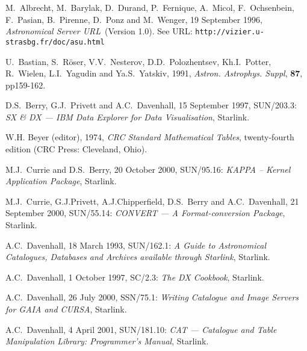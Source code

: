 \documentclass[twoside,11pt]{article}
\newcommand{\xref}[3]{#1}
\renewcommand{\_}{\texttt{\symbol{95}}}
\begin{document}


% 
\newpage
{}
\begin{thebibliography}{99}

   M.~Albrecht, M.~Barylak, D.~Durand, P.~Fernique, 
   A.~Micol, F.~Ochsenbein, F.~Pasian, B.~Pirenne, D.~Ponz and 
   M.~Wenger, 19 September 1996, {\it Astronomical Server URL}\,
   (Version 1.0).  See URL: {\tt http://vizier.u-strasbg.fr/doc/asu.html}

   U.~Bastian, S.~R\"{o}ser, V.V.~Nesterov, D.D.~Polozhentsev,
   Kh.I.~Potter, R.~Wielen, L.I.~Yagudin and Ya.S.~Yatskiv, 1991,
   {\it Astron. Astrophys. Suppl}, {\bf 87}, pp159-162.

   D.S.~Berry, G.J.~Privett and A.C.~Davenhall,
   15 September 1997, \xref{SUN/203.3}{sun203}{}: {\it SX \& DX ---
   IBM Data Explorer for Data Visualisation}, Starlink.

   W.H. Beyer (editor), 1974, {\it CRC Standard
   Mathematical Tables}, twenty-fourth edition (CRC Press: Cleveland,
   Ohio).

   M.J.~Currie and D.S.~Berry, 20 October 2000,
   \xref{SUN/95.16}{sun95}{}: {\it KAPPA -- Kernel Application Package},
   Starlink.

   M.J.~Currie, G.J.Privett, A.J.Chipperfield, D.S.~Berry
   and A.C.~Davenhall, 21 September 2000, \xref{SUN/55.14}{sun55}{}: {\it
   CONVERT --- A Format-conversion Package}, Starlink.

   A.C.~Davenhall, 18 March 1993, \xref{SUN/162.1}{sun162}{}: 
   {\it A Guide to Astronomical Catalogues, Databases and Archives available
   through Starlink}, Starlink.

   A.C.~Davenhall, 1 October 1997, \xref{SC/2.3}{sc2}{}:
   {\it The DX Cookbook}, Starlink.

   A.C.~Davenhall, 26 July 2000,
   \xref{SSN/75.1}{ssn75}{}: {\it Writing Catalogue and Image Servers for
   GAIA and CURSA}, Starlink.

   A.C.~Davenhall, 4 April 2001,
   \xref{SUN/181.10}{sun181}{}: {\it CAT --- Catalogue and Table Manipulation
   Library: Programmer's Manual}, Starlink.


\end{thebibliography}
\end{document}
